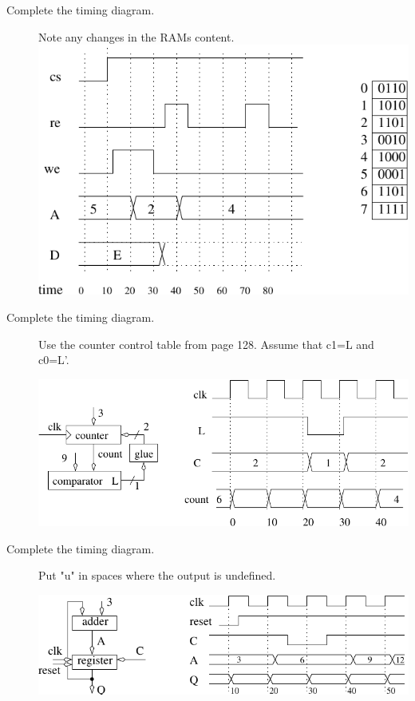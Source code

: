 \begin{description}
\vspace{1.0in}

\item[Complete the timing diagram.]  Note any changes in
the RAMs content.
\includegraphics{./FigWork/RAMTime}

\pagebreak

\item[Complete the timing diagram.]  Use the counter control table 
from page 128.  Assume that c1=L and c0=L'.

\includegraphics{./FigWork/work1}

\item[Complete the timing diagram.]  Put "u" in spaces where the output
is undefined.

\includegraphics{./FigWork/work2} 


\end{description}
